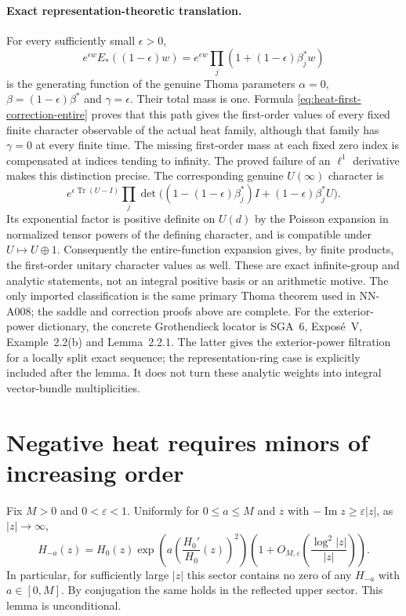 \paragraph{Exact representation-theoretic translation.}
For every sufficiently small $\epsilon>0$,
\[
 e^{\epsilon w}E_*((1-\epsilon)w)
 =e^{\epsilon w}\prod_j(1+(1-\epsilon)\beta_j^*w)
\]
is the generating function of the genuine Thoma parameters
$\alpha=0$, $\beta=(1-\epsilon)\beta^*$ and $\gamma=\epsilon$.
Their total mass is one. Formula
\eqref{eq:heat-first-correction-entire} proves that this path gives
the first-order values of every fixed finite character observable
of the actual heat family, although that family has $\gamma=0$
at every finite time. The missing first-order mass at each fixed
zero index is compensated at indices tending to infinity.
The proved failure of an $\ell^1$ derivative makes this distinction
precise. The corresponding genuine $U(\infty)$ character is
\[
 e^{\epsilon\operatorname{Tr}(U-I)}
 \prod_j\det\bigl((1-(1-\epsilon)\beta_j^*)I
                         +(1-\epsilon)\beta_j^*U\bigr).
\]
Its exponential factor is positive definite on $U(d)$ by the
Poisson expansion in normalized tensor powers of the defining
character, and is compatible under $U\mapsto U\oplus1$.
Consequently the entire-function expansion gives, by finite
products, the first-order unitary character values as well.
These are exact infinite-group and analytic statements, not an
integral positive basis or an arithmetic motive. The only imported
classification is the same primary Thoma theorem used in NN-A008;
the saddle and correction proofs above are complete.
For the exterior-power dictionary, the concrete Grothendieck
locator is SGA~6, Expos\'e~V, Example~2.2(b) and Lemma~2.2.1.
The latter gives the exterior-power filtration for a locally
split exact sequence; the representation-ring case is explicitly
included after the lemma. It does not turn these analytic weights
into integral vector-bundle multiplicities.


\section{Negative heat requires minors of increasing order}
\label{sec:analytic-pf-order-escape}

\begin{lemma}
\label{lem:analytic-heat-angular}
Fix $M>0$ and $0<\varepsilon<1$. Uniformly for $0\le a\le M$ and
$z$ with $-\operatorname{Im}z\ge\varepsilon|z|$, as $|z|\to\infty$,
\begin{equation}\label{eq:analytic-angular-asymptotic}
 H_{-a}(z)=H_0(z)
   \exp\left(a\left(\frac{H_0'}{H_0}(z)\right)^2\right)
       \left(1+O_{M,\varepsilon}
              \left(\frac{\log^2|z|}{|z|}\right)\right).
\end{equation}
In particular, for sufficiently large $|z|$ this sector contains
no zero of any $H_{-a}$ with $a\in[0,M]$. By conjugation the same
holds in the reflected upper sector. This lemma is unconditional.
\end{lemma}

